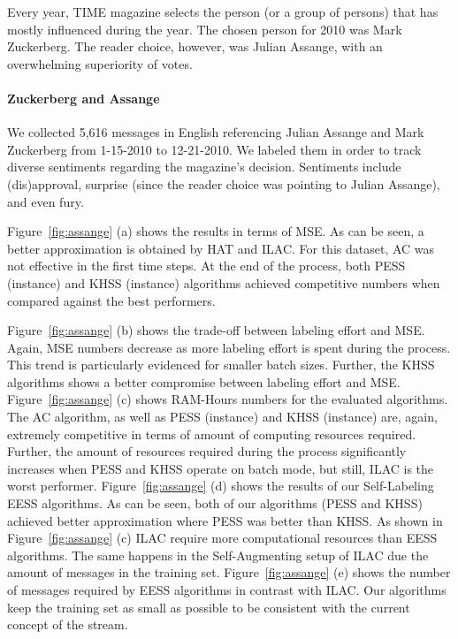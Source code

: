 Every year, TIME magazine selects the person (or a group of persons) that
has mostly influenced during the year. The chosen person for 2010 was Mark Zuckerberg. The reader choice, however, was Julian Assange, with an overwhelming superiority of votes.

\paragraph*{\bf{Zuckerberg and Assange}}
We collected 5,616 messages in English
referencing Julian Assange and Mark Zuckerberg from 1-15-2010 to 12-21-2010.
We labeled them in order to track diverse sentiments regarding the magazine's decision. Sentiments include (dis)approval, surprise (since the reader choice was pointing to Julian Assange),
and even fury.

Figure~\ref{fig:assange} (a) shows the results in terms of MSE.
As can be seen, a better approximation is obtained by HAT and ILAC.
For this dataset, AC was not effective in the first
time steps. At the end of the process, both PESS (instance) and KHSS (instance) algorithms achieved competitive numbers when compared against the best performers.

Figure~\ref{fig:assange} (b) shows the trade-off between labeling effort and MSE. Again, MSE numbers decrease as more labeling effort is spent during the process. This trend is particularly evidenced for smaller batch sizes. Further, the KHSS algorithms shows a better compromise between labeling effort and MSE.
Figure~\ref{fig:assange} (c)
shows RAM-Hours numbers for the evaluated algorithms. The AC algorithm, as well as PESS (instance) and KHSS (instance) are, again, extremely competitive in terms of amount of computing resources required. Further, the amount of resources required during the process significantly increases when PESS and KHSS operate on batch mode, but still, ILAC is the worst performer.
Figure~\ref{fig:assange} (d) shows the results of our Self-Labeling EESS algorithms. As can be seen, both of our algorithms (PESS and KHSS) achieved better approximation where PESS was better than KHSS.
As shown in Figure~\ref{fig:assange} (c) ILAC require more computational resources than EESS algorithms. The same happens in the Self-Augmenting setup of ILAC due the amount of messages in the training set. Figure~\ref{fig:assange} (e) shows the number of messages required by EESS algorithms in contrast with ILAC. Our algorithms keep the training set as small as possible to be consistent with the current concept of the stream.


